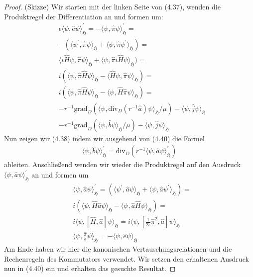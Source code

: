 \documentclass[11pt,a4paper,leqno]{report}
\numberwithin{equation}{chapter}
\begin{document}
\begin{proof}(Skizze)
Wir starten mit der linken Seite von (4.37), wenden die Produktregel der Differentiation an und formen um:
\begin{align*}
	&\epsilon\langle \psi, \hat{e}\psi\rangle_{\mathfrak{H}}^\prime = -\langle \psi, \hat{\pi}\psi\rangle_{\mathfrak{H}}^\prime=\\
	&-(\langle \psi^\prime, \hat{\pi}\psi\rangle_{\mathfrak{H}}+\langle \psi, \hat{\pi}\psi^\prime\rangle_{\mathfrak{H}})=\\
	&\langle i\hat{H}\psi, \hat{\pi}\psi\rangle_{\mathfrak{H}}+\langle \psi, \hat{\pi}i\hat{H}\psi\rangle_{\mathfrak{H}})=\\
	&i(\langle \psi, \hat{\pi}\hat{H}\psi\rangle_{\mathfrak{H}} - \langle \hat{H}\psi, \hat{\pi}\psi\rangle_{\mathfrak{H}})=\\
	&i(\langle \psi, \hat{\pi}\hat{H}\psi\rangle_{\mathfrak{H}} - \langle \psi, \hat{H}\hat{\pi}\psi\rangle_{\mathfrak{H}})=\\
	&-r^{-1} \text{grad}_D(\langle\psi,\text{div}_D(r^{-1}\hat{a})\psi\rangle_{\mathfrak{H}}/\mu) -  \langle \psi, \hat{j} \psi\rangle_{\mathfrak{H}}\\
	&-r^{-1} \text{grad}_D(\langle\psi,\hat{b}\psi\rangle_{\mathfrak{H}}/\mu) -  \langle \psi, \hat{j} \psi\rangle_{\mathfrak{H}}
\end{align*}
Nun zeigen wir (4.38) indem wir ausgehend von (4.40) die Formel
	\begin{align}
\langle \psi, \hat{b}\psi\rangle_{\mathfrak{H}}^\prime = \text{div}_D(r^{-1}\langle \psi, \hat{a}\psi\rangle_{\mathfrak{H}}^\prime)
\end{align}
ableiten. Anschließend wenden wir wieder die Produktregel auf den Ausdruck $\langle \psi, \hat{a}\psi\rangle_{\mathfrak{H}}^\prime$ an und formen um
	\begin{align*}
	&\langle \psi, \hat{a}\psi\rangle_{\mathfrak{H}}^\prime= (\langle \psi^\prime, \hat{a}\psi\rangle_{\mathfrak{H}}+\langle \psi, \hat{a}\psi^\prime\rangle_{\mathfrak{H}})=\\
	&i(\langle \psi, \hat{H}\hat{a}\psi\rangle_{\mathfrak{H}} - \langle \psi, \hat{a}\hat{H}\psi\rangle_{\mathfrak{H}})=\\
	&i\langle \psi, [\hat{H},\hat{a}]\psi\rangle_{\mathfrak{H}}=i\langle \psi, [\frac{1}{2\epsilon}\hat{\pi}^2,\hat{a}]\psi\rangle_{\mathfrak{H}}\\
	&\langle \psi, \frac{\hat{\pi}}{\epsilon}\psi\rangle_{\mathfrak{H}}=-\langle \psi, \hat{e}\psi\rangle_{\mathfrak{H}}
\end{align*}		
Am Ende haben wir hier die kanonischen Vertauschungsrelationen und die Rechenregeln des Kommutators verwendet.
Wir setzen den erhaltenen Ausdruck nun in (4.40) ein und erhalten das gesuchte Resultat.
\end{proof}
\end{document}
